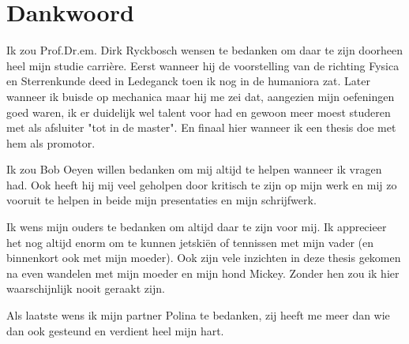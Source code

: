 \chapter*{Dankwoord}
Ik zou Prof.Dr.em. Dirk Ryckbosch wensen te bedanken om daar te zijn doorheen
heel mijn studie carrière. Eerst wanneer hij de voorstelling van de richting
Fysica en Sterrenkunde deed in Ledeganck toen ik nog in de humaniora zat. Later wanneer ik buisde op
mechanica maar hij me zei dat, aangezien mijn oefeningen goed waren, ik er
duidelijk wel talent voor had en gewoon meer moest studeren met als afsluiter
"tot in de master". En finaal hier wanneer ik een thesis doe met hem als
promotor.

Ik zou Bob Oeyen willen bedanken om mij altijd te helpen wanneer ik
vragen had. Ook heeft hij mij veel geholpen door kritisch te zijn op
mijn werk en mij zo vooruit te helpen in beide mijn presentaties en
mijn schrijfwerk.

Ik wens mijn ouders te bedanken om altijd daar te zijn voor mij.
Ik apprecieer het nog altijd enorm om te kunnen jetskiën of
tennissen met mijn vader (en binnenkort ook met mijn moeder).
Ook zijn vele inzichten in deze thesis gekomen na even wandelen
met mijn moeder en mijn hond Mickey.  Zonder hen zou ik hier
waarschijnlijk nooit geraakt zijn.

Als laatste wens ik mijn partner Polina te bedanken, zij heeft me
meer dan wie dan ook gesteund en verdient heel mijn hart.
\newpage
{\hypersetup{hidelinks}\tableofcontents} %
\newpage



